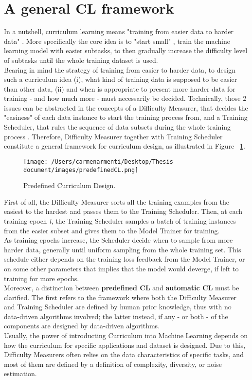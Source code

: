 \section{A general CL framework}
In a nutshell, curriculum learning means "training from easier data to harder data" \cite{Wang2020}. More specifically the
core idea is to "start small" \cite{ELMAN199371}, train the machine learning model with easier subtasks, to then gradually increase
the difficulty level of subtasks until the whole training dataset is used.\\
Bearing in mind the strategy of training from easier to harder data, to design such a curriculum idea 
(i), what kind of training data is supposed to be easier than other data, (ii) and when is appropriate to present more harder
data for training - and how much more - must necessarily be decided.
Technically, those 2 issues can be abstracted in the concepts of a Difficulty Measurer, that decides the "easiness"
of each data instance to start the training process from, and a Training Scheduler, that rules the sequence of data subsets during 
the whole training process \cite{Wang2020}.
Therefore, Difficulty Measurer together with Training Scheduler constitute a general framework for curriculum design,
as illustrated in Figure ~\ref{fig:CLdesign}.
\begin{figure}[h]
    \begin{center}
        \texttt{[image: /Users/carmenarmenti/Desktop/Thesis document/images/predefinedCL.png]}
        \caption{\label{fig:CLdesign}Predefined Curriculum Design.}
    \end{center}
\end{figure}
First of all, the Difficulty Measurer sorts all the training examples from the easiest 
to the hardest and passes them to the Training Scheduler. Then, at each training epoch \textit{t}, the Training Scheduler
samples a batch of training instances from the easier subset and gives them to the Model Trainer for training.\\
As training epochs increase, the Scheduler decide when to sample from more harder data, generally until uniform sampling
from the whole training set. This schedule either depends on the training loss feedback from the Model Trainer, or on some other
parameters that implies that the model would deverge, if left to training for more epochs.\\
Moreover, a distinction between \textbf{predefined CL} and \textbf{automatic CL} must be clarified. The first refers to the framework
where both the Difficulty Measurer and Training Scheduler are defined by human prior knowledge, thus with no data-driven
algorithms involved; the latter instead, if any - or both - of the components are designed by data-driven algorithms.\\
Usually, the power of introducting Curriculum into Machine Learning depends on how the curriculum for specific
applications and dataset is designed. Due to this, Difficulty Measurers often relies on the data
characteristics of specific tasks, and most of them are defined by a definition of complexity, diversity, or noise estimation.

